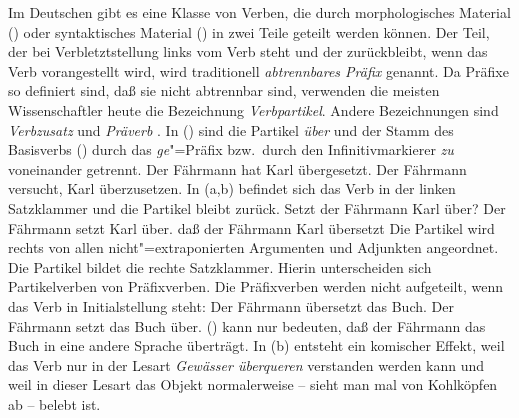 Im Deutschen gibt es eine Klasse von Verben, die durch
morphologisches Material () oder syntaktisches
Material () in zwei Teile geteilt werden können. 
Der Teil, der bei Verbletztstellung links vom Verb steht und
der zurückbleibt, wenn das Verb vorangestellt wird, wird
traditionell \emph{abtrennbares Präfix} genannt. Da Präfixe
so definiert sind, daß sie nicht abtrennbar sind, verwenden
die meisten Wissenschaftler heute die Bezeichnung \emph{Verbpartikel}.
Andere Bezeichnungen sind \emph{Verbzusatz} und \emph{Präverb} \citep[]{Jung67a}.
In () sind die Partikel \emph{über} und der Stamm des Basisverbs ()
durch das \emph{ge}"=Präfix bzw.\ durch den Infinitivmarkierer \emph{zu} voneinander getrennt.
\eal
\ex{}
Der Fährmann hat Karl übergesetzt.
\ex
Der Fährmann versucht, Karl überzusetzen.
\zl
In (a,b) befindet sich das Verb in der linken Satzklammer und die Partikel bleibt zurück.
\eal
\ex
Setzt der Fährmann Karl über?
\ex
Der Fährmann setzt Karl über.
\label{ex-setzt-ueber}
\ex
daß der Fährmann Karl übersetzt
\zl
Die Partikel wird rechts von allen nicht"=extraponierten Argumenten und Adjunkten
angeordnet. Die Partikel bildet die rechte Satzklammer. Hierin unterscheiden sich Partikelverben
von Präfixverben. Die Präfixverben werden nicht aufgeteilt, wenn das Verb in Initialstellung
steht:\enlargethispage{\baselineskip}
\eal
\ex Der Fährmann übersetzt das Buch.
\ex Der Fährmann setzt das Buch über.
\zl
() kann nur bedeuten, daß der Fährmann das Buch in eine andere Sprache überträgt.
In (b) entsteht ein komischer Effekt, weil das Verb nur in der Lesart \emph{Gewässer überqueren}
verstanden werden kann und weil in dieser Lesart das Objekt normalerweise -- sieht man mal von Kohlköpfen ab --
belebt ist.

